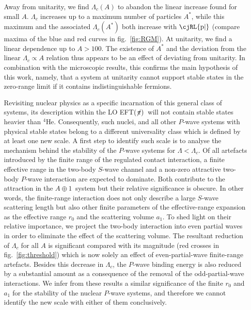 \documentclass[onecolumn,preprint,superscriptaddress,nofootinbib]{revtex4-1}
\newcommand{\lc}{\ensuremath{\Lambda_c}}
\newcommand{\abb}{\mbox{\ensuremath{A\oplus 1}}}
\newcommand{\eftnopi}{\mbox{EFT$(\not \! \pi)$}}
\newcommand{\Pe}{\text{\cjRL{p|}}}
\newcommand{\figref}[1]{fig.~\ref{#1}}
\begin{document}
Away from unitarity, we find $\lc(A)$ to abandon the linear increase found for small $A$.
$\lc$ increases up to a maximum number of particles $A^*$, while this maximum and the associated $\lc(A^*)$
both increase with $\Pe$ (compare maxima of the blue and red curves in \figref{fig:RGM}). At unitarity,
we find a linear dependence up to $A>100$.
The existence of $A^*$ and the deviation from the linear $\Lambda_c\propto A$ relation thus appears to be an effect of deviating from unitarity.
In combination with the microscopic results, this confirms the main hypothesis of this work, namely,
that a system at unitarity cannot
support stable states in the zero-range limit if it contains indistinguishable fermions.

Revisiting nuclear physics as a specific incarnation of this general class of systems,
its description within the LO \eftnopi~will not contain stable states heavier than $^4$He.
Consequently, such nuclei, and all other $P$-wave systems with physical stable states
belong to a different universality class which is defined by at least one new scale.
A first step to identify such scale is to analyse the mechanism behind the stability of the $P$-wave systems for $\Lambda<\lc$.
Of all artefacts introduced by the finite range of the regulated contact interaction,
a finite effective range in the two-body $S$-wave channel and a non-zero attractive two-body $P$-wave interaction are expected to dominate. 
Both contribute to the attraction in the \abb~system but their relative significance is obscure.
In other words, the finite-range interaction does not only describe a large $S$-wave scattering length but
also other finite parameters of the effective-range expansion as the effective range $r_0$ and the scattering volume $a_1$.
To shed light on their relative importance, we project the two-body interaction into even partial waves in order to eliminate the effect of the scattering volume.
The resultant reduction of $\lc$ for all $A$ is significant compared with its
magnitude (red crosses in \figref{fig:threshold}) which is now solely an effect of
even-partial-wave finite-range artefacts. 
Besides this decrease in $\lc$, the $P$-wave binding energy is also reduced by a substantial amount
as a consequence of the removal of the odd-partial-wave interactions.
We infer from these results a similar significance of the finite $r_0$ and $a_1$ for the stability of the nuclear $P$-wave systems, and therefore we cannot identify the new scale
with either of them conclusively.
%
\end{document}
